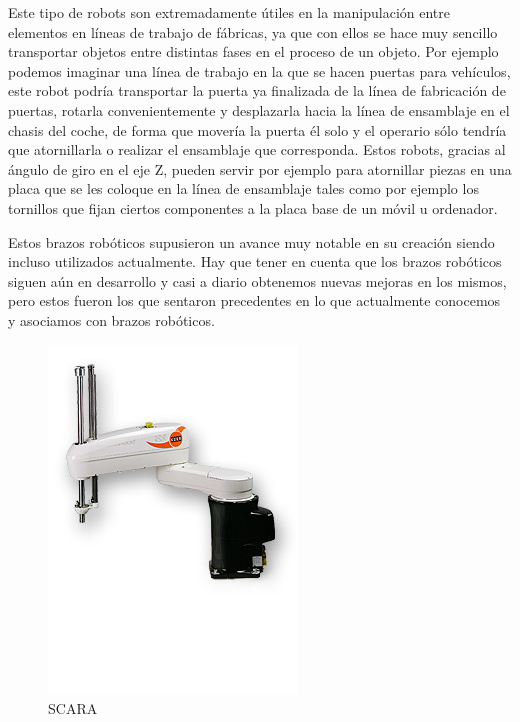 Este tipo de robots son extremadamente útiles en la manipulación entre elementos en líneas de trabajo de fábricas, ya que con ellos se hace muy sencillo transportar objetos entre distintas fases en el proceso de un objeto. Por ejemplo podemos imaginar una línea de trabajo en la que se hacen puertas para vehículos, este robot podría transportar la puerta ya finalizada de la línea de fabricación de puertas, rotarla convenientemente y desplazarla hacia la línea de ensamblaje en el chasis del coche, de forma que movería la puerta él solo y el operario sólo tendría que atornillarla o realizar el ensamblaje que corresponda. Estos robots, gracias al ángulo de giro en el eje Z, pueden servir por ejemplo para atornillar piezas en una placa que se les coloque en la línea de ensamblaje tales como por ejemplo los tornillos que fijan ciertos componentes a la placa base de un móvil u ordenador.

Estos brazos robóticos supusieron un avance muy notable en su creación siendo incluso utilizados actualmente. Hay que tener en cuenta que los brazos robóticos siguen aún en desarrollo y casi a diario obtenemos nuevas mejoras en los mismos, pero estos fueron los que sentaron precedentes en lo que actualmente conocemos y asociamos con brazos robóticos.

\begin{figure}[!h]
	\centering
	\includegraphics[scale=0.5]{./EtapaModerna/Imagenes/SCARA.jpg}
	\caption{SCARA}
	\label{fig:scara}
\end{figure}
